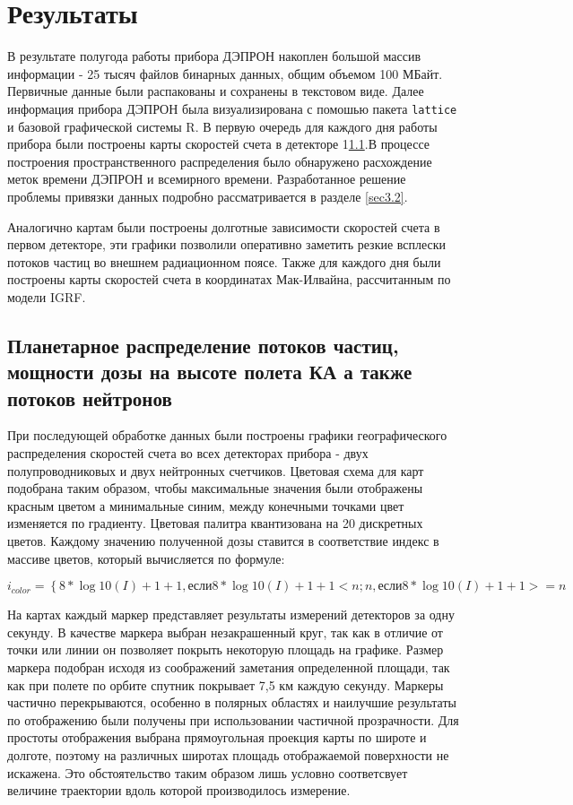 
\chapter{Результаты}\label{chapt_results}
В результате полугода работы прибора ДЭПРОН накоплен большой массив информации - 25 тысяч файлов бинарных данных, общим объемом 100 МБайт. Первичные данные были распакованы и сохранены в текстовом виде.
Далее информация прибора ДЭПРОН была визуализирована с помошью пакета \texttt{lattice} и базовой графической системы R. 
В первую очередь для каждого дня работы прибора были построены карты скоростей счета в детекторе 1\ref{sec:planetDose}.В процессе построения пространственного распределения было обнаружено расхождение меток времени  ДЭПРОН и всемирного времени. Разработанное решение проблемы привязки данных подробно рассматривается в разделе \ref{sec3.2}.

Аналогично картам были построены долготные зависимости скоростей счета в первом детекторе, эти графики позволили оперативно заметить резкие всплески потоков частиц во внешнем радиационном поясе. Также для каждого дня были построены карты скоростей счета в координатах Мак-Илвайна, рассчитанным по модели IGRF.

\section{Планетарное распределение потоков частиц, мощности дозы на высоте полета КА а также потоков нейтронов} \label{sec:planetDose}
При последующей обработке данных были построены графики географического распределения скоростей счета во всех детекторах прибора - двух полупроводниковых и двух нейтронных счетчиков. Цветовая схема для карт подобрана таким образом, чтобы максимальные значения были отображены красным цветом а минимальные синим, между конечными точками цвет изменяется по градиенту. Цветовая палитра квантизована на 20 дискретных цветов. Каждому значению полученной дозы ставится в соответствие индекс в массиве цветов, который вычисляется по формуле:

\[ i_{color}  = \left\lbrace{8*\log{10}(I) + 1} +1, если 8*\log{10}(I) + 1 +1<n;
							n, если 8*\log{10}(I) + 1 +1>=n\]
						
						
%
На картах каждый маркер представляет результаты измерений детекторов за одну секунду. В качестве маркера выбран незакрашенный круг, так как в отличие от точки или линии он позволяет покрыть некоторую площадь на графике. Размер маркера подобран исходя из соображений заметания определенной площади, так как  при полете по орбите спутник покрывает 7,5 км каждую секунду. Маркеры частично перекрываются, особенно в полярных областях и наилучшие результаты по отображению были получены при использовании частичной прозрачности. Для простоты отображения выбрана прямоугольная проекция карты по широте и долготе, поэтому на различных широтах площадь отображаемой поверхности не искажена. Это обстоятельство таким образом лишь условно соответсвует величине траектории вдоль которой производилось измерение.

